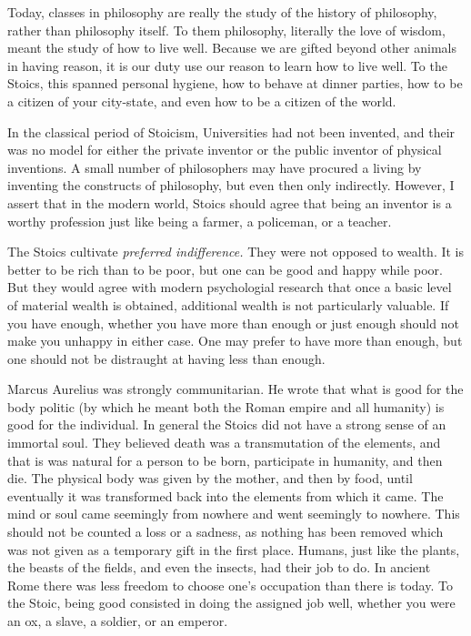 \documentclass[
	fontsize=10pt, %
	twoside=false, %
	secnumdepth=1, %
]{kaobook}
\begin{document}
Today, classes in philosophy are really the study
of the history of philosophy, rather than philosophy itself.
To them philosophy, literally the love of wisdom,
meant the study of how to live well.
Because we are gifted beyond other animals in having
reason, it is our duty use our reason to learn how to live
well.
To the Stoics, this spanned personal hygiene,
how to behave at dinner parties, how to be a citizen
of your city-state, and even how to be a citizen of the world.

In the classical period of Stoicism, Universities had
not been invented, and their was no model for either
the private inventor or the public inventor of physical
inventions.
A small number of philosophers may have procured a
living by inventing the constructs of philosophy, but
even then only indirectly.
However, I assert that in the modern world, Stoics
should agree that being an inventor is a worthy profession
just like being a farmer, a policeman, or a teacher.

The Stoics cultivate {\em preferred indifference.}
They were not opposed to wealth.
It is better to be rich than to be poor,
but one can be good and happy while poor.
But they would agree with modern psychologial research
that once a basic level of material wealth is obtained,
additional wealth is not particularly valuable.
If you have enough, whether you have more than enough
or just enough should not make you unhappy in either case.
One may prefer to have more than enough, but one should
not be distraught at having less than enough.

Marcus Aurelius was strongly communitarian.
He wrote that what is good for the body politic (by which
he meant both the Roman empire and all humanity) is good
for the individual.
In general the Stoics did not have a strong sense of
an immortal soul.
They believed death was a transmutation of the elements,
and that is was natural for a person to be born, participate
in humanity, and then die.
The physical body was given by the mother, and
then by food, until eventually it was transformed back into
the elements from which it came.
The mind or soul came seemingly from nowhere and went
seemingly to nowhere.
This should not be counted a loss
or a sadness, as nothing has been removed which was not
given as a temporary gift in the first place.
Humans, just like the plants, the beasts of the fields,
and even the insects, had their job to do.
In ancient Rome there was less freedom to choose
one's occupation than there is today.
To the Stoic, being good consisted in doing the assigned job
well, whether you were an ox, a slave, a soldier, or an emperor.
\end{document}
